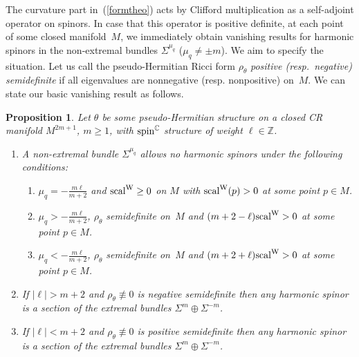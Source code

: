 \documentclass[10pt,a4paper]{amsart}
\numberwithin{equation}{section}
\newtheorem{Proposition}[Theorem]{Proposition}
 { \theoremstyle{definition}
\newtheorem{Definition}[Theorem]{Definition}
\newtheorem{Example}[Theorem]{Example}
\newtheorem{Remark}[Theorem]{Remark} }
\newcommand{\ZZ}{\mathbb{Z}}
\newcommand{\CC}{\mathbb{C}}
\begin{document}
The curvature part in~(\ref{formtheo}) acts by Clifford multiplication as a self-adjoint operator on spinors. In case that this operator is positive definite, at each point
of some closed manifold~$M$,
we immediately obtain vanishing results for harmonic spinors in the non-extremal bundles $\Sigma^{\mu_q}$ ($\mu_q\neq \pm m$).
We aim to specify the situation.
Let us call the pseudo-Hermitian Ricci form $\rho_\theta$ {\em positive (resp.\ negative) semidefinite} if all eigenvalues are nonnegative (resp. nonpositive) on~$M$.
We can state our basic vanishing result as follows.

\begin{Proposition} \label{vani} Let $\theta$ be some pseudo-Hermitian structure on a closed CR manifold $M^{2m+1}$,
$m\geq 1$, with ${\rm spin}^\CC$ structure of weight $\ell\in \ZZ$.
\begin{enumerate}\itemsep=0pt
\item[$(a)$] A non-extremal bundle $\Sigma^{\mu_q}$ allows no harmonic spinors under the following conditions:
\begin{enumerate}\itemsep=0pt
\item[$(1)$] $\mu_q=-\frac{m\ell}{m+2}$ and ${\rm scal}^{\rm W}\geq 0$ on $M$ with ${\rm scal}^{\rm W}(p)>0$ at some point $p\in M$.
\item[$(2)$] $\mu_q>-\frac{m\ell}{m+2}$, $\rho_\theta$ semidefinite on~$M$ and $(m+2-\ell){\rm scal}^{\rm W}>0$ at some point $p\in M$.
\item[$(3)$] $\mu_q<-\frac{m\ell}{m+2}$, $\rho_\theta$ semidefinite on~$M$ and $(m+2+\ell){\rm scal}^{\rm W}>0$ at some point $p\in M$.
\end{enumerate}
\item[$(b)$] If $|\ell|>m+2$ and $\rho_\theta\not\equiv 0$ is negative semidefinite then
any harmonic spinor is a section of the extremal bundles $\Sigma^m\oplus \Sigma^{-m}$.
\item[$(c)$] If $|\ell|<m+2$ and $\rho_\theta\not\equiv 0$ is positive semidefinite then
any harmonic spinor is a section of the extremal bundles $\Sigma^m\oplus \Sigma^{-m}$.
\end{enumerate}
\end{Proposition}
\end{document}
